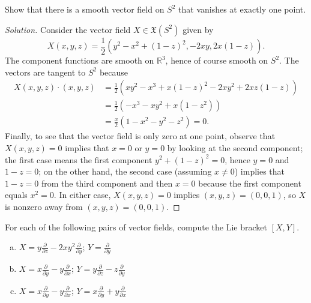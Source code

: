 \documentclass[10pt]{article}
\providecommand{\half}{\frac{1}{2}}
\providecommand{\RR}{\mathbb R}
\providecommand{\ii}{\item}
\newenvironment{soln}{\begin{proof}[Solution]}{\end{proof}}
\begin{document}
\begin{problem}
    Show that there is a smooth vector field on $S^2$
    that vanishes at exactly one point.
\end{problem}

\begin{soln}
    Consider the vector field $X\in\mathfrak X(S^2)$ given by
    \begin{equation*}
	X(x,y,z) = \frac 12(y^2-x^2 + (1-z)^2, -2xy, 2x(1-z)).
    \end{equation*}
    The component functions are smooth on $\RR^3$,
    hence of course smooth on $S^2$.
    The vectors are tangent to $S^2$ because
    \begin{align*}
        X(x,y,z)\cdot(x,y,z)
	&= \half(xy^2 - x^3 + x(1-z)^2 - 2xy^2 + 2xz(1-z))\\
	&= \half(-x^3 - xy^2 + x(1-z^2))\\
	&= \frac x2(1-x^2 - y^2 - z^2) = 0.
    \end{align*}
    Finally, to see that the vector field is only zero at one point,
    observe that $X(x,y,z) = 0$ implies that $x = 0$ or $y = 0$
    by looking at the second component; the first case means
    the first component $y^2 + (1-z)^2 = 0$,
    hence $y=0$ and $1-z=0$; on the other hand,
    the second case (assuming $x\ne 0$)
    implies that $1-z=0$ from the third component
    and then $x = 0$ because the first component equals $x^2 = 0$.
    In either case, $X(x,y,z) = 0$ implies $(x,y,z) = (0,0,1)$,
    so $X$ is nonzero away from $(x,y,z) = (0,0,1)$.
\end{soln}

\begin{problem}
    For each of the following pairs of vector fields,
    compute the Lie bracket $[X,Y]$.
    \begin{enumerate}[(a)]
	\ii $X = y\frac{\partial}{\partial z}
	- 2xy^2\frac{\partial}{\partial y}$;
	$Y = \frac{\partial}{\partial y}$
	\ii $X = x\frac\partial{\partial y} - y\frac\partial{\partial x}$;
	$Y = y\frac\partial{\partial z}-z\frac\partial{\partial y}$
	\ii $X = x\frac\partial{\partial y} - y\frac\partial{\partial x}$;
	$Y = x\frac\partial{\partial y} + y\frac\partial{\partial x}$
    \end{enumerate}
\end{problem}
\end{document}
